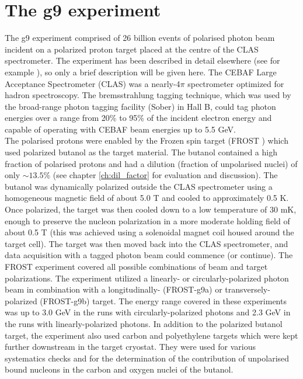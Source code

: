 \section{The g9 experiment}
The g9 experiment comprised of 26 billion events of polarised photon beam incident on a polarized proton target placed at the centre of the CLAS spectrometer. The experiment has been described in detail elsewhere (see for example \cite{Strauch_2014}), so only a brief description will be given here. 
 The CEBAF Large Acceptance Spectrometer (CLAS)\cite{CLAS} was a nearly-4$\pi$ spectrometer optimized for hadron spectroscopy. The bremsstrahlung tagging technique, which was used by the broad-range photon tagging facility (Sober\cite{Sober_2000}) in Hall B, could tag photon energies over a range from 20\% to 95\% of the incident electron energy and capable of operating with CEBAF beam energies up to 5.5 GeV. \\
The polarised protons were enabled by the Frozen spin target (FROST \cite{Keith_2012}) which used polarized butanol as the target material.
The butanol contained a high fraction of polarised protons and had a dilution (fraction of unpolarised nuclei) of only $\sim 13.5\%$ (see chapter \ref{ch:dil_factor} for evaluation and discussion).
 The butanol was dynamically polarized outside the CLAS spectrometer using a homogeneous magnetic field of about 5.0 T and cooled to approximately 0.5 K. Once polarized, the target was then cooled down to a low temperature of 30 mK, enough to preserve the nucleon polarization in a more moderate holding field of about 0.5 T (this was achieved using a solenoidal magnet coil housed around the target cell). The target was then moved back into the CLAS spectrometer, and data acquisition with a tagged photon beam could commence (or continue). The FROST experiment covered all possible combinations of beam and target polarizations. The experiment utilized a linearly- or circularly-polarized photon beam in combination with a longitudinally- (FROST-g9a) or transversely-polarized (FROST-g9b) target. The energy range covered in these experiments was up to 3.0 GeV in the runs with circularly-polarized photons and 2.3 GeV in the runs with linearly-polarized photons. In addition to the polarized butanol target, the experiment also used carbon and polyethylene targets which were kept further downstream in the target cryostat. They were used for various systematics checks and for the determination of the contribution of unpolarised bound nucleons in the carbon and oxygen nuclei of the butanol.
